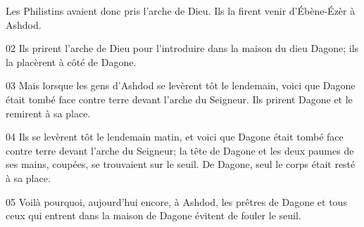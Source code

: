  Les Philistins avaient donc pris l’arche de Dieu. Ils la firent venir d’Ébène-Ézèr à Ashdod.

02 Ils prirent l’arche de Dieu pour l’introduire dans la maison du dieu Dagone; ils la placèrent à côté de Dagone.

03 Mais lorsque les gens d’Ashdod se levèrent tôt le lendemain, voici que Dagone était tombé face contre terre devant l’arche du Seigneur. Ils prirent Dagone et le remirent à sa place.

04 Ils se levèrent tôt le lendemain matin, et voici que Dagone était tombé face contre terre devant l’arche du Seigneur; la tête de Dagone et les deux paumes de ses mains, coupées, se trouvaient sur le seuil. De Dagone, seul le corps était resté à sa place.

05 Voilà pourquoi, aujourd’hui encore, à Ashdod, les prêtres de Dagone et tous ceux qui entrent dans la maison de Dagone évitent de fouler le seuil.
